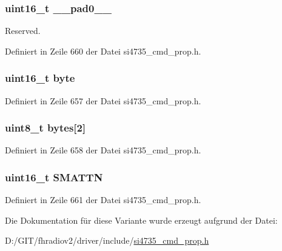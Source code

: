 \subsubsection[{\+\_\+\+\_\+pad0\+\_\+\+\_\+}]{\setlength{\rightskip}{0pt plus 5cm}uint16\+\_\+t \+\_\+\+\_\+pad0\+\_\+\+\_\+}\label{unionfm__soft__mute__max__att_a77132c2c26a75f5b8751b235cda23828}


Reserved. 



Definiert in Zeile 660 der Datei si4735\+\_\+cmd\+\_\+prop.\+h.

\hypertarget{unionfm__soft__mute__max__att_ab0549c1b5ea980a02e7eab77e21fea49}{}
\subsubsection[{byte}]{\setlength{\rightskip}{0pt plus 5cm}uint16\+\_\+t byte}\label{unionfm__soft__mute__max__att_ab0549c1b5ea980a02e7eab77e21fea49}


Definiert in Zeile 657 der Datei si4735\+\_\+cmd\+\_\+prop.\+h.

\hypertarget{unionfm__soft__mute__max__att_a46e4c05d20a047ec169f60d3167e912e}{}
\subsubsection[{bytes}]{\setlength{\rightskip}{0pt plus 5cm}uint8\+\_\+t bytes\mbox{[}2\mbox{]}}\label{unionfm__soft__mute__max__att_a46e4c05d20a047ec169f60d3167e912e}


Definiert in Zeile 658 der Datei si4735\+\_\+cmd\+\_\+prop.\+h.

\hypertarget{unionfm__soft__mute__max__att_a92e22d724c6a2970d60915dab1a06c42}{}
\subsubsection[{S\+M\+A\+T\+T\+N}]{\setlength{\rightskip}{0pt plus 5cm}uint16\+\_\+t S\+M\+A\+T\+T\+N}\label{unionfm__soft__mute__max__att_a92e22d724c6a2970d60915dab1a06c42}


Definiert in Zeile 661 der Datei si4735\+\_\+cmd\+\_\+prop.\+h.



Die Dokumentation für diese Variante wurde erzeugt aufgrund der Datei\+:\begin{DoxyCompactItemize}
\item 
D\+:/\+G\+I\+T/fhradiov2/driver/include/\hyperlink{si4735__cmd__prop_8h}{si4735\+\_\+cmd\+\_\+prop.\+h}\end{DoxyCompactItemize}
